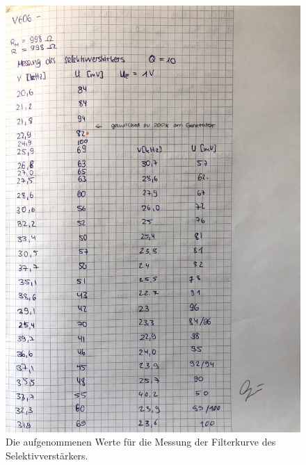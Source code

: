 \begin{figure}
    \centering
    \includegraphics[width=\textwidth]{content/datenselektiv.pdf}
    \caption{Die aufgenommenen Werte für die Messung der Filterkurve des Selektivverstärkers.}
    \label{fig:datenselektiv}
\end{figure}
